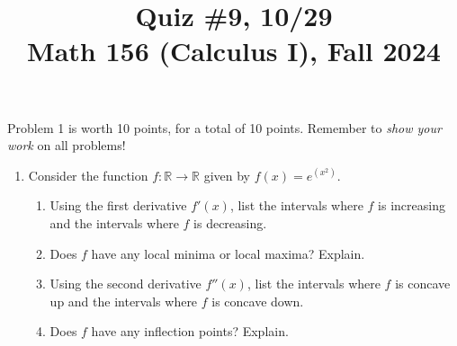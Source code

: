 \documentclass[11pt]{article}
\title{Quiz \#9, 10/29 \\ Math 156 (Calculus I), Fall 2024}
\date{}
\begin{document}
\maketitle

\thispagestyle{empty}

\vspace{-1cm}

Problem 1 is worth 10 points, for a total of 10 points. Remember to \emph{show your work} on all problems!

\begin{enumerate}
\item Consider the function $f\colon \mathbb{R} \to \mathbb{R}$ given by $f(x) = e^{(x^2)}$.
\begin{enumerate}
\item Using the first derivative $f'(x)$, list the intervals where $f$ is increasing and the intervals where $f$ is decreasing.
\item Does $f$ have any local minima or local maxima? Explain.
\item Using the second derivative $f''(x)$, list the intervals where $f$ is concave up and the intervals where $f$ is concave down.
\item Does $f$ have any inflection points? Explain.
\end{enumerate}

\end{enumerate}
\end{document}
